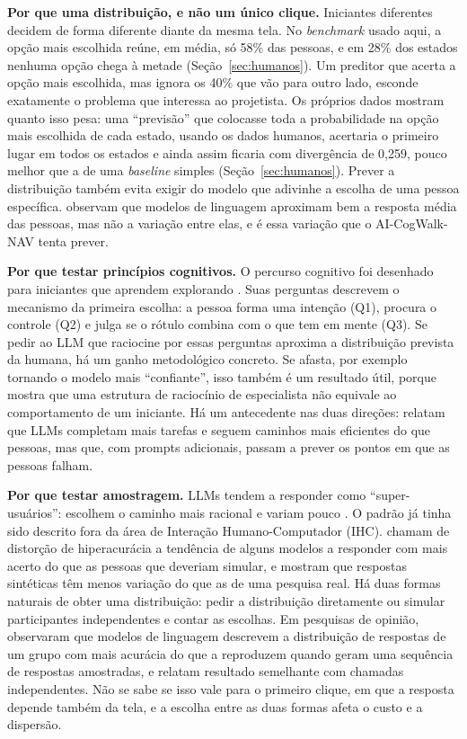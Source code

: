 \documentclass[12pt,oneside,a4paper,chapter=TITLE,english,brazil]{abntex2}
\newcommand{\proj}{AI-CogWalk-NAV}
\begin{document}
\textbf{Por que uma distribuição, e não um único clique.} Iniciantes diferentes decidem de forma diferente diante da mesma tela. No \textit{benchmark} usado aqui, a opção mais escolhida reúne, em média, só 58\% das pessoas, e em 28\% dos estados nenhuma opção chega à metade (Seção~\ref{sec:humanos}). Um preditor que acerta a opção mais escolhida, mas ignora os 40\% que vão para outro lado, esconde exatamente o problema que interessa ao projetista. Os próprios dados mostram quanto isso pesa: uma ``previsão'' que colocasse toda a probabilidade na opção mais escolhida de cada estado, usando os dados humanos, acertaria o primeiro lugar em todos os estados e ainda assim ficaria com divergência de 0,259, pouco melhor que a de uma \textit{baseline} simples (Seção~\ref{sec:humanos}). Prever a distribuição também evita exigir do modelo que adivinhe a escolha de uma pessoa específica.  observam que modelos de linguagem aproximam bem a resposta média das pessoas, mas não a variação entre elas, e é essa variação que o \proj{} tenta prever.

\textbf{Por que testar princípios cognitivos.} O percurso cognitivo foi desenhado para iniciantes que aprendem explorando \cite{polson1992cw,wharton1994cw}. Suas perguntas descrevem o mecanismo da primeira escolha: a pessoa forma uma intenção (Q1), procura o controle (Q2) e julga se o rótulo combina com o que tem em mente (Q3). Se pedir ao LLM que raciocine por essas perguntas aproxima a distribuição prevista da humana, há um ganho metodológico concreto. Se afasta, por exemplo tornando o modelo mais ``confiante'', isso também é um resultado útil, porque mostra que uma estrutura de raciocínio de especialista não equivale ao comportamento de um iniciante. Há um antecedente nas duas direções:  relatam que LLMs completam mais tarefas e seguem caminhos mais eficientes do que pessoas, mas que, com prompts adicionais, passam a prever os pontos em que as pessoas falham.

\textbf{Por que testar amostragem.} LLMs tendem a responder como ``super-usuários'': escolhem o caminho mais racional e variam pouco \cite{kuric2026wwgc,zhong2025syntheticcw}. O padrão já tinha sido descrito fora da área de Interação Humano-Computador (IHC).  chamam de distorção de hiperacurácia a tendência de alguns modelos a responder com mais acerto do que as pessoas que deveriam simular, e  mostram que respostas sintéticas têm menos variação do que as de uma pesquisa real. Há duas formas naturais de obter uma distribuição: pedir a distribuição diretamente ou simular participantes independentes e contar as escolhas. Em pesquisas de opinião,  observaram que modelos de linguagem descrevem a distribuição de respostas de um grupo com mais acurácia do que a reproduzem quando geram uma sequência de respostas amostradas, e  relatam resultado semelhante com chamadas independentes. Não se sabe se isso vale para o primeiro clique, em que a resposta depende também da tela, e a escolha entre as duas formas afeta o custo e a dispersão.
\end{document}
